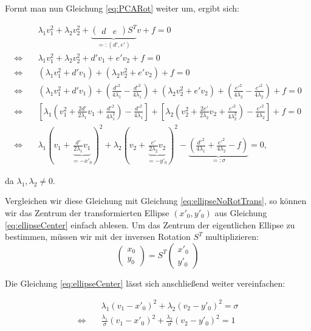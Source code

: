 Formt man nun Gleichung \ref{eq:PCARot} weiter um, ergibt sich:

\begin{equation}\label{eq:ellipseCenter}
\begin{aligned}
&\lambda_1v_1^2 + \lambda_2v_2^2 + \underbrace{\begin{pmatrix}d & e\end{pmatrix}S^T}_{=:(d', e')}v + f = 0 \\
\Leftrightarrow\quad &\lambda_1v_1^2 + \lambda_2v_2^2 + d'v_1 + e'v_2 + f = 0 \\
\Leftrightarrow\quad &(\lambda_1v_1^2 + d'v_1)+ (\lambda_2v_2^2 + e'v_2) + f = 0\\
\Leftrightarrow\quad &(\lambda_1v_1^2 + d'v_1) + (\frac{d'^2}{4\lambda_1} - \frac{d'^2}{4\lambda_1}) + (\lambda_2v_2^2 + e'v_2) + (\frac{e'^2}{4\lambda_2} - \frac{e'^2}{4\lambda_2}) + f = 0 \\
\Leftrightarrow\quad &\left[\lambda_1\left(v_1^2 + \frac{2d'}{2\lambda_1}v_1 + \frac{d'^2}{4\lambda_1^2}\right) - \frac{d'^2}{4\lambda_1}\right] +\left[\lambda_2\left(v_2^2 + \frac{2e'}{2\lambda_2}v_2 + \frac{e'^2}{4\lambda_2^2}\right) - \frac{e'^2}{4\lambda_2}\right] + f = 0 \\
\Leftrightarrow\quad &\lambda_1(v_1 + \underbrace{\frac{d'}{2\lambda_1}v_1}_{ = -x'_0})^2 +\lambda_2(v_2 + \underbrace{\frac{e'}{2\lambda_2}v_2}_{ = -y'_0})^2 - \underbrace{(\frac{d'^2}{4\lambda_1} + \frac{e'^2}{4\lambda_2} - f)}_{=:\sigma} = 0,
\end{aligned}
\end{equation}

da $\lambda_1, \lambda_2 \neq 0$. 

Vergleichen wir diese Gleichung mit Gleichung \ref{eq:ellipseNoRotTrans}, so können wir das Zentrum der transformierten Ellipse $(x'_0, y'_0)$ aus Gleichung \ref{eq:ellipseCenter} einfach ablesen. Um das Zentrum der eigentlichen Ellipse zu bestimmen, müssen wir mit der inversen Rotation $S^T$ multiplizieren:
\[
\begin{pmatrix} x_0 \\ y_0 \end{pmatrix} = S^T \begin{pmatrix} x'_0 \\ y'_0 \end{pmatrix}
\]

Die Gleichung \ref{eq:ellipseCenter} lässt sich anschließend weiter vereinfachen: 

\begin{equation} \label{eq:PCAKoeff}
\begin{aligned}
&\lambda_1(v_1 -x'_0)^2 +\lambda_2(v_2 -y'_0)^2 = \sigma \\
\Leftrightarrow\quad & \frac{\lambda_1}{\sigma}(v_1 -x'_0)^2 +\frac{\lambda_2}{\sigma}(v_2 -y'_0)^2  =1
\end{aligned}
\end{equation}

